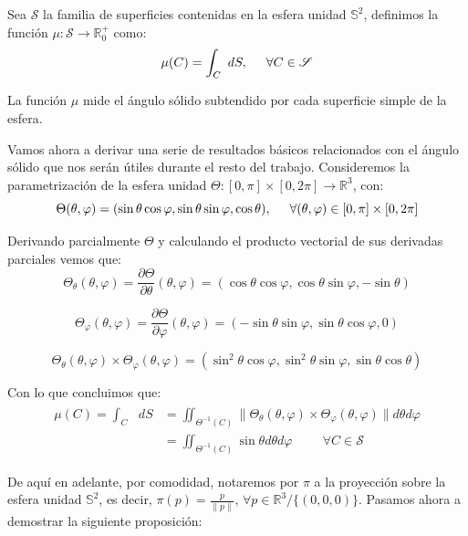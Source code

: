 \begin{definicion}
  Sea $\mathscr{S}$ la familia de superficies contenidas en la esfera unidad $\mathds {S}^2$, definimos la función $\mu :\mathscr{S} \rightarrow \mathds{R}^+_0$ como:
  $$\mu(C) = \int_C \text{ }dS , \hspace{0.5cm} \forall C\in \mathscr{S}$$

  La función $\mu$ mide el ángulo sólido subtendido por cada superficie simple de la esfera.
\end{definicion}

Vamos ahora a derivar una serie de resultados básicos relacionados con el ángulo sólido que nos serán útiles durante el resto del trabajo. Consideremos la parametrización de la esfera unidad $\Theta:[0,\pi ]\times [0,2\pi ]\rightarrow \mathds{R}^3$, con:
$$\Theta(\theta ,\varphi ) = ( \sin \theta \cos \varphi,  \sin \theta \sin \varphi , \cos \theta),\hspace{0.5cm}  \forall (\theta , \varphi)\in [0,\pi ]\times [0,2\pi ]$$

Derivando parcialmente $\Theta$ y calculando el producto vectorial de sus derivadas parciales vemos que:
$$\Theta _\theta(\theta ,\varphi ) = \frac{\partial \Theta}{\partial \theta}(\theta ,\varphi ) = (\cos\theta\cos\varphi, \cos\theta\sin\varphi, -\sin\theta)$$

$$\Theta _\varphi(\theta ,\varphi ) = \frac{\partial \Theta}{\partial \varphi}(\theta ,\varphi ) = (-\sin\theta\sin\varphi, \sin\theta\cos\varphi, 0)$$

$$\Theta _\theta(\theta ,\varphi )\times \Theta _\varphi(\theta ,\varphi ) = (\sin^2\theta\cos\varphi,\sin^2\theta\sin\varphi,\sin\theta\cos\theta)$$

Con lo que concluimos que:
\begin{align}\label{intAngSolSin}
\begin{split}
\mu (C) = \int_C \text{ }dS &= \iint_{\Theta^{-1}(C)}\|\Theta _\theta(\theta ,\varphi )\times \Theta _\varphi(\theta ,\varphi )\| d\theta d\varphi \\
&= \iint_{\Theta^{-1}(C)} \sin\theta d\theta d\varphi \hspace{1cm} \forall C \in \mathscr{S}
\end{split}
\end{align}

De aquí en adelante, por comodidad, notaremos por $\pi$ a la proyección sobre la esfera unidad $\mathds{S}^2$, es decir, $\pi(p)=\frac{p}{\|p\|}$, $\forall p \in \mathds{R}^3/\{(0,0,0)\}$. Pasamos ahora a demostrar la siguiente proposición:

